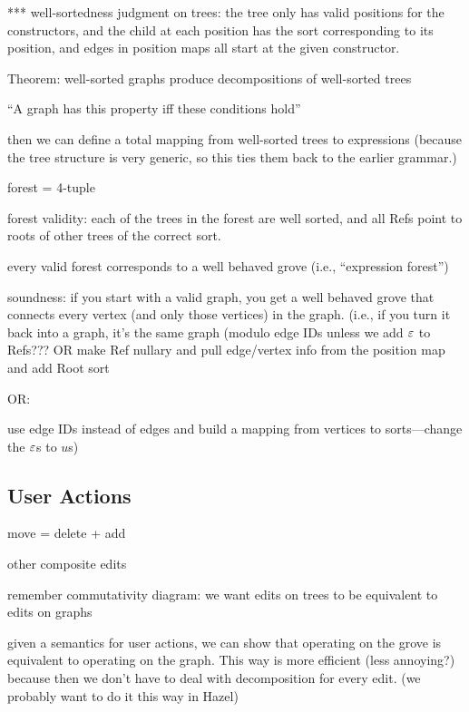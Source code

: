 *** well-sortedness judgment on trees: the tree only has valid positions for the
constructors, and the child at each position has the sort corresponding to its
position, and edges in position maps all start at the given constructor.

Theorem: well-sorted graphs produce decompositions of well-sorted trees

``A graph has this property iff these conditions hold''

then we can define a total mapping from well-sorted trees to expressions
(because the tree structure is very generic, so this ties them back to the
earlier grammar.)


forest = 4-tuple

forest validity: each of the trees in the forest are well sorted, and all Refs
point to roots of other trees of the correct sort.

every valid forest corresponds to a well behaved grove (i.e., ``expression
forest'')

soundness: if you start with a valid graph, you get a well behaved grove that
connects every vertex (and only those vertices) in the graph. (i.e., if you turn
it back into a graph, it's the same graph (modulo edge IDs unless we add $\varepsilon$ to
Refs??? OR make Ref nullary and pull edge/vertex info from the position map and
add Root sort

OR:

use edge IDs instead of edges and build a mapping from vertices to
sorts---change the $\varepsilon$s to $u$s)


\subsection{User Actions}%
\label{sub:User Actions}


move = delete + add

other composite edits

remember commutativity diagram: we want edits on trees to be equivalent to edits on graphs

given a semantics for user actions, we can show that operating on the grove is equivalent to operating on the graph.
This way is more efficient (less annoying?) because then we don't have to deal with decomposition for every edit.
(we probably want to do it this way in Hazel)

